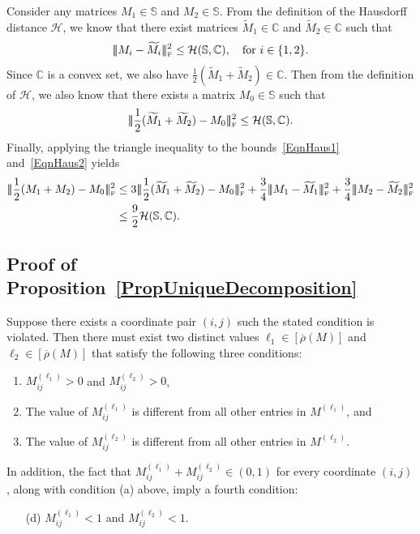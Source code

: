 \documentclass[11pt, hidelinks]{article} %
\newcommand{\matsnorm}[2]{|\!|\!| #1 | \! | \!|_{{#2}}}
\newcommand{\frobnorm}[1]{\ensuremath{\matsnorm{#1}{\mbox{\tiny{F}}}}}
\newcommand{\hausDis}{\mathcal{H}}
\newcommand{\half}{\ensuremath{{\frac{1}{2}}}}
\newcommand{\wtmatrix}{M}
\newcommand{\wt}{\wtmatrix}
\newcommand{\wttil}{\widetilde{\wtmatrix}}
\newcommand{\permrank}{\rho}
\newcommand{\fnpermrank}[1]{\overline{\permrank}(#1)}
\newcommand{\convexclass}{\ensuremath{\mathbb{C}}}
\newcommand{\genclass}{\ensuremath{\mathbb{S}}}
\begin{document}
Consider any matrices $\wt_1 \in \genclass$ and $\wt_2 \in
\genclass$. From the definition of the Hausdorff distance $\hausDis$, we know that there
exist matrices $\wttil_1 \in \convexclass$ and $\wttil_2 \in
\convexclass$ such that
\begin{align}
\label{EqnHaus1}
\frobnorm{\wt_i - \wttil_i}^2 \leq \hausDis(\genclass, \convexclass),
\quad \mbox{for } i \in \{1,2\}.
\end{align}
Since $\convexclass$ is a convex set, we also have $\half (\wttil_1 +
\wttil_2)\in \convexclass$. Then from the definition of $\hausDis$, we
also know that there exists a matrix $\wt_0 \in \genclass$ such that
\begin{align}
\label{EqnHaus2}
\frobnorm{\half (\wttil_1 + \wttil_2) - \wt_0}^2 \leq
\hausDis(\genclass, \convexclass).
\end{align} 
Finally, applying the triangle inequality to the bounds~\eqref{EqnHaus1} and~\eqref{EqnHaus2} yields
\begin{align*}
\frobnorm{\half(\wt_1 + \wt_2) - \wt_0 }^2 &\leq
3\frobnorm{\half(\wttil_1 + \wttil_2) - \wt_0 }^2 + \frac{3}{4}
\frobnorm{\wt_1 - \wttil_1}^2 + \frac{3}{4} \frobnorm{\wt_2 -
  \wttil_2}^2 \\
%
& \leq \frac{9}{2} \hausDis(\genclass, \convexclass).
\end{align*}



\subsection{Proof of Proposition~\ref{PropUniqueDecomposition}}

Suppose there exists a coordinate pair $(i,j)$ such the stated
condition is violated. Then there must exist two distinct values
$\ell_1 \in [\fnpermrank{\wt}]$ and $\ell_2 \in [\fnpermrank{\wt}]$ that satisfy the
following three conditions:
\begin{enumerate}[label=(\alph*),topsep=0pt,itemsep=-1ex,partopsep=1ex,parsep=1ex]
\item $\wt^{(\ell_1)}_{ij} > 0$ and
$\wt^{(\ell_2)}_{ij} > 0$,
\item The value of $\wt^{(\ell_1)}_{ij}$ is different
from all other entries in $\wt^{(\ell_1)}$, and
\item
The value of $\wt^{(\ell_2)}_{ij}$ is different from all other entries in
$\wt^{(\ell_2)}$.
\end{enumerate}
In addition, the fact that $\wt^{(\ell_1)}_{ij} + \wt^{(\ell_2)}_{ij}
\in (0,1)$ for every coordinate $(i,j)$, along with condition (a)
above, imply a fourth condition:
\begin{enumerate}[label=(\alph*),topsep=0pt,itemsep=-1ex,partopsep=1ex,parsep=1ex]
	\item[(d)] $\wt^{(\ell_1)}_{ij} < 1$
and $\wt^{(\ell_2)}_{ij} < 1$.
\end{enumerate}
\end{document}
